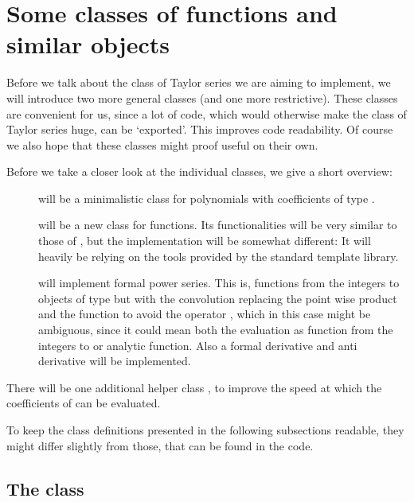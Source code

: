 \section{Some classes of functions and similar objects}

Before we talk about the class of Taylor series we are aiming to implement, we will introduce two more general classes (and one more restrictive). These classes are convenient for us, since a lot of code, which would otherwise make the class of Taylor series huge, can be \lq exported\rq. This improves code readability. Of course we also hope that these classes might proof useful on their own.

Before we take a closer look at the individual classes, we give a short overview:
\begin{description}
\item[] will be a minimalistic class for polynomials with coefficients of type .
\item[] will be a new class for functions. Its functionalities will be very similar to those of , but the implementation will be somewhat different: It will heavily be relying on the tools provided by the \ccOx standard template library.
\item[] will implement formal power series. This is, functions from the integers to objects of type  but with the convolution replacing the point wise product and the function  to avoid the operator \code{()}, which in this case might be ambiguous, since it could mean both the evaluation as function from the integers to  or analytic function. Also a formal derivative and anti derivative will be implemented.
\end{description}

There will be one additional helper class , to improve the speed at which the coefficients of  can be evaluated.

To keep the class definitions presented in the following subsections readable, they might differ slightly from those, that can be found in the code. 

\subsection{The class }

